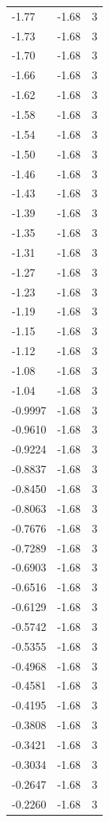 \begin{longtable}{lrr}
  -1.77 & -1.68 & 3 \\
  -1.73 & -1.68 & 3 \\
  -1.70 & -1.68 & 3 \\
  -1.66 & -1.68 & 3 \\
  -1.62 & -1.68 & 3 \\
  -1.58 & -1.68 & 3 \\
  -1.54 & -1.68 & 3 \\
  -1.50 & -1.68 & 3 \\
  -1.46 & -1.68 & 3 \\
  -1.43 & -1.68 & 3 \\
  -1.39 & -1.68 & 3 \\
  -1.35 & -1.68 & 3 \\
  -1.31 & -1.68 & 3 \\
  -1.27 & -1.68 & 3 \\
  -1.23 & -1.68 & 3 \\
  -1.19 & -1.68 & 3 \\
  -1.15 & -1.68 & 3 \\
  -1.12 & -1.68 & 3 \\
  -1.08 & -1.68 & 3 \\
  -1.04 & -1.68 & 3 \\
  -0.9997 & -1.68 & 3 \\
  -0.9610 & -1.68 & 3 \\
  -0.9224 & -1.68 & 3 \\
  -0.8837 & -1.68 & 3 \\
  -0.8450 & -1.68 & 3 \\
  -0.8063 & -1.68 & 3 \\
  -0.7676 & -1.68 & 3 \\
  -0.7289 & -1.68 & 3 \\
  -0.6903 & -1.68 & 3 \\
  -0.6516 & -1.68 & 3 \\
  -0.6129 & -1.68 & 3 \\
  -0.5742 & -1.68 & 3 \\
  -0.5355 & -1.68 & 3 \\
  -0.4968 & -1.68 & 3 \\
  -0.4581 & -1.68 & 3 \\
  -0.4195 & -1.68 & 3 \\
  -0.3808 & -1.68 & 3 \\
  -0.3421 & -1.68 & 3 \\
  -0.3034 & -1.68 & 3 \\
  -0.2647 & -1.68 & 3 \\
  -0.2260 & -1.68 & 3 \\

\end{longtable}
